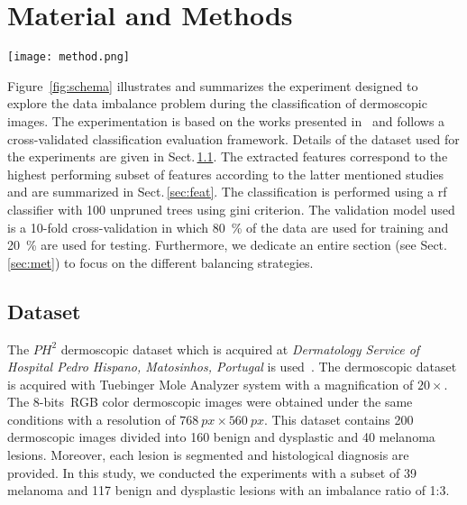 
\graphicspath{ {./content/method/figures/} }

\section{Material and Methods}\label{sec:mm}


\begin{figure*}[Ht]
  \centering
  \texttt{[image: method.png]}
  \caption{Framework outline}
	\label{fig:schema}
\end{figure*}

Figure~\ref{fig:schema} illustrates and summarizes the experiment designed to explore the data imbalance problem during the classification of dermoscopic images.
The experimentation is based on the works presented in~\cite{rastgoo2015automatic, rastgoo2015ensemble} and follows a cross-validated classification evaluation framework.
Details of the dataset used for the experiments are given in Sect.\,\ref{sec:dataset}. 
The extracted features correspond to the highest performing subset of features according to the latter mentioned studies and are summarized in Sect.\,\ref{sec:feat}.
The classification is performed using a \ac{rf} classifier with 100 unpruned trees using gini criterion.
The validation model used is a 10-fold cross-validation in which \SI{80}{\percent} of the data are used for training and \SI{20}{\percent} are used for testing.
Furthermore, we dedicate an entire section (see Sect.\,\ref{sec:met}) to focus on the different balancing strategies.

\subsection{Dataset}\label{sec:dataset}
The $PH^{2}$ dermoscopic dataset which is acquired at \textit{Dermatology Service of Hospital Pedro Hispano, Matosinhos, Portugal} is used~\cite{barata2013two}.
The dermoscopic dataset is acquired with Tuebinger Mole Analyzer system with a magnification of $20 \times$.
The 8-bits~RGB color dermoscopic images were obtained under the same conditions with a resolution of $\SI{768}{px} \times \SI{560}{px}$. 
This dataset contains 200 dermoscopic images divided into 160 benign and dysplastic and 40 melanoma lesions. Moreover, each lesion is segmented and histological diagnosis are provided. 
In this study, we conducted the experiments with a subset of 39 melanoma and 117 benign and dysplastic lesions with an imbalance ratio of 1:3.


